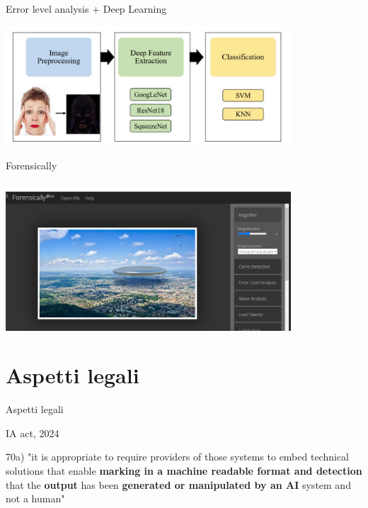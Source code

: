 \documentclass[11pt]{beamer}
\begin{document}
\begin{frame}{Error level analysis + Deep Learning \cite{rafique2023deep}}
\begin{center}
\includegraphics[width=0.8\textwidth]{Pic/ELA+DEEP.png}
\end{center}
\end{frame}

\begin{frame}{Forensically \cite{fr}}
\begin{center}
\includegraphics[width=0.8\textwidth]{Pic/forensically.png}
\end{center}
\end{frame}



\section{Aspetti legali}

\begin{frame}
\begin{center}
\Huge
Aspetti legali
\end{center}
\end{frame}



\begin{frame}{IA act, 2024}
\begin{center}
\small
70a) "it is appropriate to require providers of those systems to embed technical solutions that enable \textbf{marking in a machine readable format and detection }that the \textbf{output} has been \textbf{generated or manipulated by an AI} system and not a human"
\end{center}
\end{frame}
\end{document}
